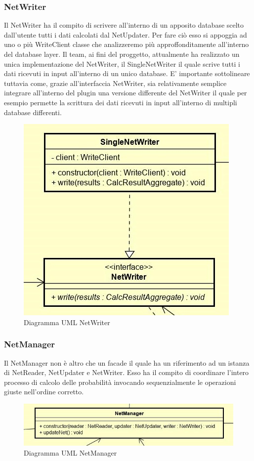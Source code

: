 \subsubsection{NetWriter}
Il NetWriter ha il compito di scrivere all'interno di un apposito database scelto dall'utente tutti i dati calcolati dal NetUpdater. Per fare ciò esso si appoggia ad uno o più WriteClient classe che analizzeremo più approffonditamente all'interno del database layer.
Il team, ai fini del proggetto, attualmente ha realizzato un unica implementazione del NetWriter, il SingleNetWriter il quale scrive tutti i dati ricevuti in input all'interno di un unico database. 
E' importante sottolineare tuttavia come, grazie all'interfaccia NetWriter, sia relativamente semplice integrare all'interno del plugin una versione differente del NetWriter il quale per esempio permette la scrittura dei dati ricevuti in input all'interno di multipli database differenti.
\begin{figure} [H]
	\centering
	\includegraphics[scale=1]{Img/NetWriter}
	\caption{Diagramma UML NetWriter}\label{}
\end{figure}
\subsubsection{NetManager}
Il NetManager non è altro che un facade il quale ha un riferimento ad un istanza di NetReader, NetUpdater e NetWriter. Esso ha il compito di coordinare l'intero processo di calcolo delle probabilità invocando sequenzialmente le operazioni giuste nell'ordine corretto.
\begin{figure} [H]
	\centering
	\includegraphics[scale=0.8]{Img/NetManager}
	\caption{Diagramma UML NetManager}\label{}
\end{figure}
